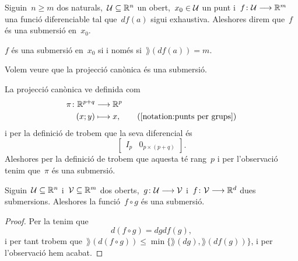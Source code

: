 \documentclass[../../main.tex]{subfiles}
\begin{document}
    \begin{definition}[Submersió]
        \label{def:submersió}
        Siguin~\(n\geq m\) dos naturals,~\(\mathcal{U}\subseteq\mathbb{R}^{n}\) un obert,~\(x_{0}\in\mathcal{U}\) un punt i~\(f\colon\mathcal{U}\longrightarrow\mathbb{R}^{m}\) una funció diferenciable tal que~\(df(a)\) sigui exhaustiva.
        Aleshores direm que~\(f\) és una submersió en~\(x_{0}\).
    \end{definition}
    \begin{observation}
        \label{obs:submersió si i només si té rang més petit o igual}
        \(f\) és una submersió en~\(x_{0}\) si i només si~\(\rang(df(a))=m\).
    \end{observation}
    \begin{example}
        \label{ex:la projecció canònica és una submersió}
        Volem veure que la projecció canònica és una submersió.
        \begin{solution}
            La projecció canònica ve definida com
            \begin{align*}
                \pi\colon\mathbb{R}^{p+q}&\longrightarrow\mathbb{R}^{p} \\
                (x;y)&\longmapsto x, \tag{\ref{notation:punts per grups}}
            \end{align*}
            i per la definició de  trobem que la seva diferencial és
            \[\left[\begin{array}{c|c}
            I_{p} & 0_{p\times(p+q)}
            \end{array}\right].\]
            Aleshores per la definició de  trobem que aquesta té rang~\(p\) i per l'observació  tenim que~\(\pi\) és una submersió.
        \end{solution}
    \end{example}
    \begin{proposition}
        \label{prop:la composició de submersions és submersió}
        Siguin~\(\mathcal{U}\subseteq\mathbb{R}^{n}\) i~\(\mathcal{V}\subseteq\mathbb{R}^{m}\) dos oberts,~\(g\colon\mathcal{U}\longrightarrow\mathcal{V}\) i~\(f\colon\mathcal{V}\longrightarrow\mathbb{R}^{d}\) dues submersions.
        Aleshores la funció~\(f\circ g\) és una submersió.
        \begin{proof}
            Per la  tenim que
            \[
                d(f\circ g)=dgdf(g),
            \]
            i per tant trobem que~\(\rang(d(f\circ g))\leq\min\{\rang(dg),\rang(df(g))\}\), i per l'observació  hem acabat.
        \end{proof}
    \end{proposition}
\end{document}
